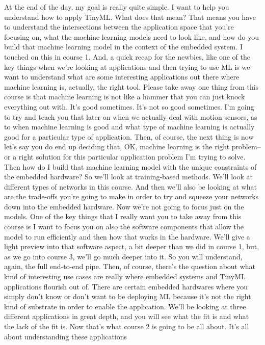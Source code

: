 At the end of the day, my goal is really quite simple.
I want to help you understand how to apply TinyML.
What does that mean?
That means you have to understand the intersections between the application
space that you're focusing on, what the machine learning models
need to look like, and how do you build that machine learning model
in the context of the embedded system.
I touched on this in course 1.
And, a quick recap for the newbies, like one
of the key things when we're looking at applications
and then trying to use ML is we want to understand
what are some interesting applications out there
where machine learning is, actually, the right tool.
Please take away one thing from this course
is that machine learning is not like a hammer
that you can just knock everything out with.
It's good sometimes.
It's not so good sometimes.
I'm going to try and teach you that later
on when we actually deal with motion sensors,
as to when machine learning is good and what type of machine learning
is actually good for a particular type of application.
Then, of course, the next thing is now let's say
you do end up deciding that, OK, machine learning is the right problem--
or a right solution for this particular application problem
I'm trying to solve.
Then how do I build that machine learning model
with the unique constraints of the embedded hardware?
So we'll look at training-based methods.
We'll look at different types of networks in this course.
And then we'll also be looking at what are the trade-offs you're
going to make in order to try and squeeze your networks down
into the embedded hardware.
Now we're not going to focus just on the models.
One of the key things that I really want you to take away from this course
is I want to focus you on also the software components that
allow the model to run efficiently and then how that works in the hardware.
We'll give a light preview into that software aspect,
a bit deeper than we did in course 1, but, as we go into course 3,
we'll go much deeper into it.
So you will understand, again, the full end-to-end pipe.
Then, of course, there's the question about what
kind of interesting use cases are really where embedded systems and TinyML
applications flourish out of.
There are certain embedded hardwares where you simply don't know or don't
want to be deploying ML because it's not the right kind of substrate
in order to enable the application.
We'll be looking at three different applications in great depth,
and you will see what the fit is and what the lack of the fit is.
Now that's what course 2 is going to be all about.
It's all about understanding these applications
